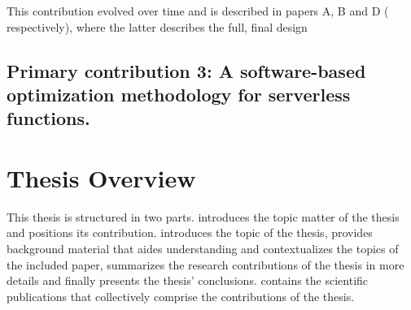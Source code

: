 \documentclass[../main.tex]{subfiles}
\begin{document}
\begin{refsection}
This contribution evolved over time and is described in papers A, B and D (  respectively), where the latter describes the full, final design



\subsection{Primary contribution 3: A software-based optimization methodology for serverless functions.}



\section{Thesis Overview}
This thesis is structured in two parts.  introduces the topic matter of the thesis and positions its contribution.  introduces the topic of the thesis,  provides background material that aides understanding and contextualizes the topics of the included paper,  summarizes the research contributions of the thesis in more details and finally  presents the thesis' conclusions.  contains the scientific publications that collectively comprise the contributions of the thesis.

\ifx\chapincluded\undefined
  \printbibliography
  \end{refsection}
 \fi
\end{document}
